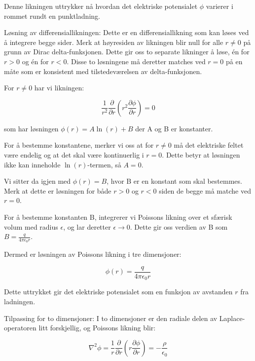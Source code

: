 Denne likningen uttrykker nå hvordan det elektriske potensialet $\phi$ varierer i rommet rundt en punktladning.

Løsning av differensiallikningen: Dette er en differensiallikning som kan løses ved å integrere begge sider. Merk at høyresiden av likningen blir null for alle $r \neq 0$ på grunn av Dirac delta-funksjonen. Dette gir oss to separate likninger å løse, én for $r > 0$ og én for $r < 0$. Disse to løsningene må deretter matches ved $r = 0$ på en måte som er konsistent med tilstedeværelsen av delta-funksjonen.

For $r \neq 0$ har vi likningen:

\begin{equation*}
\frac{1}{r^2} \frac{\partial}{\partial r} \left(r^2 \frac{\partial \phi}{\partial r}\right) = 0
\end{equation*}

som har løsningen $\phi(r) = A \ln(r) + B$ der A og B er konstanter.

For å bestemme konstantene, merker vi oss at for $r \neq 0$ må det elektriske feltet være endelig og at det skal være kontinuerlig i $r = 0$. Dette betyr at løsningen ikke kan inneholde $\ln(r)$-termen, så $A = 0$.

Vi sitter da igjen med $\phi(r) = B$, hvor B er en konstant som skal bestemmes. Merk at dette er løsningen for både $r > 0$ og $r < 0$ siden de begge må matche ved $r = 0$.

For å bestemme konstanten B, integrerer vi Poissons likning over et sfærisk volum med radius $\epsilon$, og lar deretter $\epsilon \rightarrow 0$. Dette gir oss verdien av B som $B = \frac{q}{4\pi\epsilon_0 r}$.

Dermed er løsningen av Poissons likning i tre dimensjoner:

\begin{equation*}
\phi(r) = \frac{q}{4\pi\epsilon_0 r}
\end{equation*}

Dette uttrykket gir det elektriske potensialet som en funksjon av avstanden $r$ fra ladningen.

Tilpassing for to dimensjoner: I to dimensjoner er den radiale delen av Laplace-operatoren litt forskjellig, og Poissons likning blir:

\begin{equation*}
\nabla^2 \phi = \frac{1}{r} \frac{\partial}{\partial r} \left(r \frac{\partial \phi}{\partial r}\right) = - \frac{\rho}{\epsilon_0}
\end{equation*}

